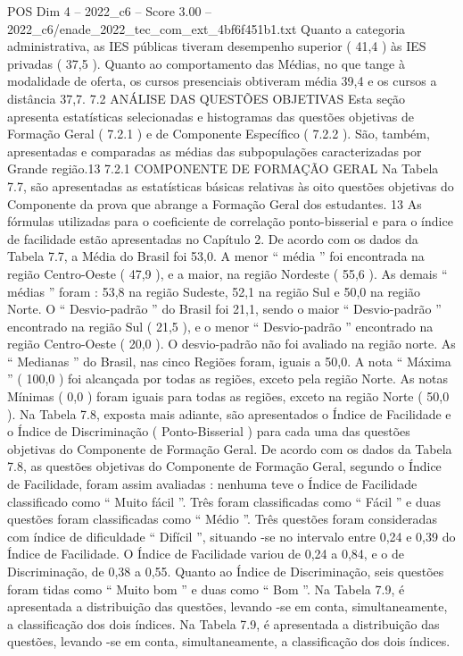 \begin{textsample}{POS Dim 4 – 2022\_c6 – Score 3.00 – 2022\_c6/enade\_2022\_tec\_com\_ext\_4bf6f451b1.txt}
Quanto a categoria administrativa, as IES públicas tiveram desempenho superior ( 41,4 ) às IES privadas ( 37,5 ).
Quanto ao comportamento das Médias, no que tange à modalidade de oferta, os cursos presenciais obtiveram média 39,4 e os cursos a distância 37,7. 7.2 ANÁLISE DAS QUESTÕES OBJETIVAS Esta seção apresenta estatísticas selecionadas e histogramas das questões objetivas de Formação Geral ( 7.2.1 ) e de Componente Específico ( 7.2.2 ).
São, também, apresentadas e comparadas as médias das subpopulações caracterizadas por Grande região.13 7.2.1 COMPONENTE DE FORMAÇÃO GERAL Na Tabela 7.7, são apresentadas as estatísticas básicas relativas às oito questões objetivas do Componente da prova que abrange a Formação Geral dos estudantes. 13 As fórmulas utilizadas para o coeficiente de correlação ponto-bisserial e para o índice de facilidade estão apresentadas no Capítulo 2.
De acordo com os dados da Tabela 7.7, a Média do Brasil foi 53,0.
A menor “ média ” foi encontrada na região Centro-Oeste ( 47,9 ), e a maior, na região Nordeste ( 55,6 ).
As demais “ médias ” foram : 53,8 na região Sudeste, 52,1 na região Sul e 50,0 na região Norte.
O “ Desvio-padrão ” do Brasil foi 21,1, sendo o maior “ Desvio-padrão ” encontrado na região Sul ( 21,5 ), e o menor “ Desvio-padrão ” encontrado na região Centro-Oeste ( 20,0 ).
O desvio-padrão não foi avaliado na região norte.
As “ Medianas ” do Brasil, nas cinco Regiões foram, iguais a 50,0.
A nota “ Máxima ” ( 100,0 ) foi alcançada por todas as regiões, exceto pela região Norte.
As notas Mínimas ( 0,0 ) foram iguais para todas as regiões, exceto na região Norte ( 50,0 ).
Na Tabela 7.8, exposta mais adiante, são apresentados o Índice de Facilidade e o Índice de Discriminação ( Ponto-Bisserial ) para cada uma das questões objetivas do Componente de Formação Geral.
De acordo com os dados da Tabela 7.8, as questões objetivas do Componente de Formação Geral, segundo o Índice de Facilidade, foram assim avaliadas : nenhuma teve o Índice de Facilidade classificado como “ Muito fácil ”.
Três foram classificadas como “ Fácil ” e duas questões foram classificadas como “ Médio ”.
Três questões foram consideradas com índice de dificuldade “ Difícil ”, situando -se no intervalo entre 0,24 e 0,39 do Índice de Facilidade.
O Índice de Facilidade variou de 0,24 a 0,84, e o de Discriminação, de 0,38 a 0,55.
Quanto ao Índice de Discriminação, seis questões foram tidas como “ Muito bom ” e duas como “ Bom ”.
Na Tabela 7.9, é apresentada a distribuição das questões, levando -se em conta, simultaneamente, a classificação dos dois índices.
Na Tabela 7.9, é apresentada a distribuição das questões, levando -se em conta, simultaneamente, a classificação dos dois índices.

\end{textsample}
